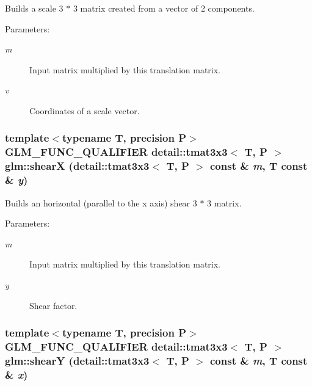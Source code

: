 Builds a scale 3 $\ast$ 3 matrix created from a vector of 2 components.

\begin{Desc}
\item[Parameters:]
\begin{description}
\item[{\em m}]Input matrix multiplied by this translation matrix. \item[{\em v}]Coordinates of a scale vector. \end{description}
\end{Desc}
\hypertarget{group__gtx__matrix__transform__2d_g921a7ae4b10ba6cc7422be200cf3afd5}{
\subsubsection[shearX]{\setlength{\rightskip}{0pt plus 5cm}template$<$typename T, precision P$>$ GLM\_\-FUNC\_\-QUALIFIER detail::tmat3x3$<$ T, P $>$ glm::shearX (detail::tmat3x3$<$ T, P $>$ const \& {\em m}, \/  T const \& {\em y})}}
\label{group__gtx__matrix__transform__2d_g921a7ae4b10ba6cc7422be200cf3afd5}


Builds an horizontal (parallel to the x axis) shear 3 $\ast$ 3 matrix.

\begin{Desc}
\item[Parameters:]
\begin{description}
\item[{\em m}]Input matrix multiplied by this translation matrix. \item[{\em y}]Shear factor. \end{description}
\end{Desc}
\hypertarget{group__gtx__matrix__transform__2d_g5f6d0ef99f6be6ff1151ca174261004d}{
\subsubsection[shearY]{\setlength{\rightskip}{0pt plus 5cm}template$<$typename T, precision P$>$ GLM\_\-FUNC\_\-QUALIFIER detail::tmat3x3$<$ T, P $>$ glm::shearY (detail::tmat3x3$<$ T, P $>$ const \& {\em m}, \/  T const \& {\em x})}}
\label{group__gtx__matrix__transform__2d_g5f6d0ef99f6be6ff1151ca174261004d}


